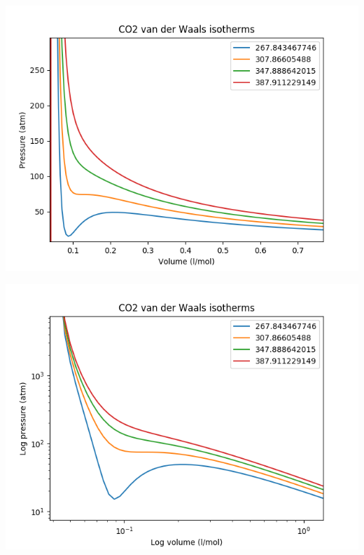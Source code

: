 \documentclass[11pt]{article}
\begin{document}
\begin{center}
\includegraphics[width=.9\linewidth]{./figs/vdWgas.png}
\end{center}

\begin{center}
\includegraphics[width=.9\linewidth]{./figs/logvdWgas.png}
\end{center}
\end{document}
